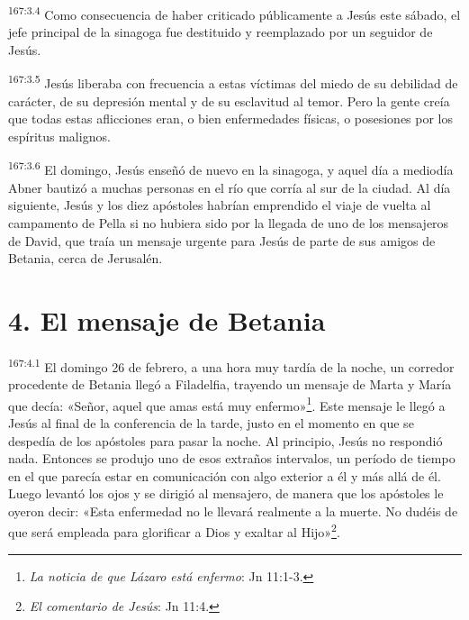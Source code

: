 \par
\textsuperscript{167:3.4} Como consecuencia de haber criticado públicamente a Jesús este sábado, el jefe principal de la sinagoga fue destituido y reemplazado por un seguidor de Jesús.

\par
\textsuperscript{167:3.5} Jesús liberaba con frecuencia a estas víctimas del miedo de su debilidad de carácter, de su depresión mental y de su esclavitud al temor. Pero la gente creía que todas estas aflicciones eran, o bien enfermedades físicas, o posesiones por los espíritus malignos.

\par
\textsuperscript{167:3.6} El domingo, Jesús enseñó de nuevo en la sinagoga, y aquel día a mediodía Abner bautizó a muchas personas en el río que corría al sur de la ciudad. Al día siguiente, Jesús y los diez apóstoles habrían emprendido el viaje de vuelta al campamento de Pella si no hubiera sido por la llegada de uno de los mensajeros de David, que traía un mensaje urgente para Jesús de parte de sus amigos de Betania, cerca de Jerusalén.

\section*{4. El mensaje de Betania}
\par
\textsuperscript{167:4.1} El domingo 26 de febrero, a una hora muy tardía de la noche, un corredor procedente de Betania llegó a Filadelfia, trayendo un mensaje de Marta y María que decía: «Señor, aquel que amas está muy enfermo»\footnote{\textit{La noticia de que Lázaro está enfermo}: Jn 11:1-3.}. Este mensaje le llegó a Jesús al final de la conferencia de la tarde, justo en el momento en que se despedía de los apóstoles para pasar la noche. Al principio, Jesús no respondió nada. Entonces se produjo uno de esos extraños intervalos, un período de tiempo en el que parecía estar en comunicación con algo exterior a él y más allá de él. Luego levantó los ojos y se dirigió al mensajero, de manera que los apóstoles le oyeron decir: «Esta enfermedad no le llevará realmente a la muerte. No dudéis de que será empleada para glorificar a Dios y exaltar al Hijo»\footnote{\textit{El comentario de Jesús}: Jn 11:4.}.

